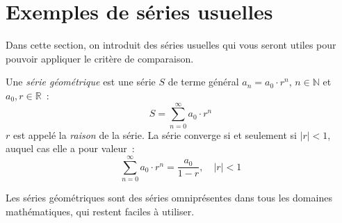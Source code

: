 
\section{Exemples de séries usuelles}\label{sec:series_exemples}
Dans cette section, on introduit des séries usuelles qui vous seront utiles pour pouvoir appliquer le critère de comparaison.

\begin{boxdef}
Une \emph{série géométrique} est une série $S$ de terme général $a_n = a_0 \cdot r^n$, $n \in \mathbb{N}$ et $a_0, r \in \mathbb{R}$~:
\begin{equation}
S = \sum_{n = 0}^{\infty} a_0 \cdot r^n
\end{equation}
$r$ est appelé la \emph{raison} de la série. La série converge si et seulement si $|r| < 1$, auquel cas elle a pour valeur~:
\begin{equation}
\sum_{n = 0}^{\infty} a_0 \cdot r^n = \frac{a_0}{1-r}, \quad |r| < 1
\end{equation}
%
\end{boxdef}
Les séries géométriques sont des séries omniprésentes dans tous les domaines mathématiques, qui restent faciles à utiliser.

